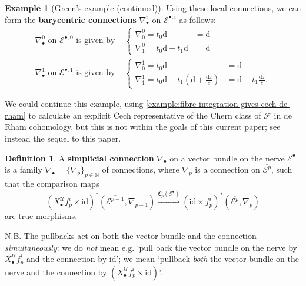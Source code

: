 \documentclass[11pt,fleqn]{article}
\theoremstyle{plain}
\theoremstyle{definition}
\newtheorem{definition}[theorem]{Definition}
\newtheorem{example}[theorem]{Example}
\theoremstyle{remark}
\numberwithin{equation}{theorem}
\newcommand{\cover}{\mathcal{U}}
\newcommand{\id}{\mathrm{id}}
\newcommand{\define}[1]{\textbf{#1}}
\newcommand{\nerve}[1]{X_{#1}^\cover}
\newcommand{\comparison}[1]{\mathfrak{C}_{#1}}
\renewcommand{\d}{\mathrm{d}}
\begin{document}
\begin{example}[Green's example (continued)]
            Using these local connections, we can form the \define{barycentric connections} $\nabla_\bullet^i$ on $\mathcal{E}^{\bullet,i}$ as follows:
            \begin{align*}
                \nabla_\bullet^0\text{ on }\mathcal{E}^{\bullet,0}\text{ is given by }
                &\begin{cases}
                    \nabla_0^0 = t_0\d&=\d\\
                    \nabla_1^0 = t_0\d+t_1\d&=\d
                \end{cases}\\
                \nabla_\bullet^1\text{ on }\mathcal{E}^{\bullet,1}\text{ is given by }
                &\begin{cases}
                    \nabla_0^1 = t_0\d&=\d\\
                    \nabla_1^1 = t_0\d+t_1\left(\d+\frac{\d z}{z}\right)&=\d+t_1\frac{\d z}{z}.
                \end{cases}
            \end{align*}

            \medskip

            We could continue this example, using \cref{example:fibre-integration-gives-cech-de-rham} to calculate an explicit Čech representative of the Chern class of $\mathscr{F}$ in de Rham cohomology, but this is not within the goals of this current paper; see instead the sequel to this paper.
        \end{example}

        \begin{definition}\label{definition:simplicial-connection}
            A \define{simplicial connection} $\nabla_\bullet$ on a vector bundle on the nerve $\mathcal{E}^\bullet$ is a family $\nabla_\bullet=\{\nabla_p\}_{p\in\mathbb{N}}$ of connections, where $\nabla_p$ is a connection on $\overline{\mathcal{E}^p}$, such that the comparison maps
            \[
                \left(\nerve{\bullet}f_p^i\times\id\right)^*
                \left(\overline{\mathcal{E}^{p-1}},\nabla_{p-1}\right)
                \xrightarrow{\comparison{p}^i(\mathcal{E}^\bullet)}
                \left(\id\times f_p^i\right)^*
                \left(\overline{\mathcal{E}^p},\nabla_p\right)
            \]
            are true morphisms.

            N.B. The pullbacks act on both the vector bundle and the connection \emph{simultaneously}: we do \emph{not} mean e.g. `pull back the vector bundle on the nerve by $\nerve{\bullet}f_p^i$ and the connection by $\id$'; we mean `pullback \emph{both} the vector bundle on the nerve and the connection by $(\nerve{\bullet}f_p^i\times\id)$'.
        \end{definition}
\end{document}
